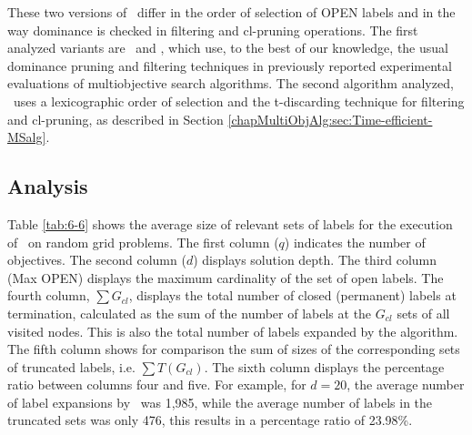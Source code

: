 These two versions of \namoa \ differ in the order of selection of OPEN labels and in the way dominance is checked in filtering and cl-pruning operations. The first analyzed variants are \namoalex \ and \namoalin, which use, to the best of our knowledge, the usual dominance pruning and filtering techniques in previously reported experimental evaluations of multiobjective search algorithms. The second algorithm analyzed, \namoate \ uses a lexicographic order of selection and the t-discarding technique for filtering and cl-pruning, as described in Section \ref{chapMultiObjAlg:sec:Time-efficient-MSalg}.

\subsection{Analysis}
\label{chapEmpiricalAnalysis:subsec:analysisgridsnamoate}

Table \ref{tab:6-6} shows the average size of relevant sets of labels for the execution of \namoate \ on random grid problems. The first column ($q$) indicates the number of objectives. The second column ($d$) displays solution depth. The third column (Max OPEN) displays the maximum cardinality of the set of open labels. The fourth column, $\sum G_{cl}$, displays the total number of closed (permanent) labels at termination, calculated as the sum of the number of labels at the $G_{cl}$ sets of all visited nodes. This is also the total number of labels expanded by the algorithm. The fifth column shows for comparison the sum of sizes of the corresponding sets of truncated labels, i.e. $\sum T(G_{cl})$. The sixth column displays the percentage ratio between columns four and five. For example, for $d = 20$, the average number of label expansions by \namoate \ was 1,985, while the average number of labels in the truncated sets was only 476, this results in a percentage ratio of 23.98\%.   

